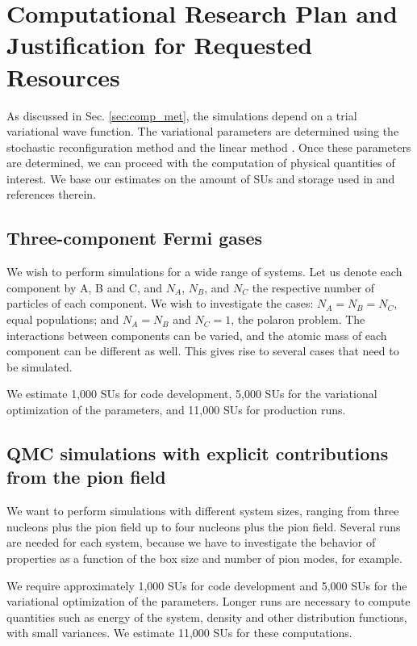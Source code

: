 \documentclass[12pt,letterpaper]{article}
\begin{document}
\section{Computational Research Plan and Justification for Requested 
Resources}

As discussed in Sec. \ref{sec:comp_met}, the simulations depend on a trial 
variational wave function. The variational parameters are determined using 
the stochastic reconfiguration method \cite{cas04}
and the linear method \cite{con17}. Once these parameters 
are determined, we can proceed with the computation of physical quantities 
of interest. We base our estimates on the amount of SUs and storage used in 
\cite{car15} 
and references therein.

\subsection{Three-component Fermi gases}

We wish to perform simulations for a wide range of systems.
Let us denote each component by A, B and C, and $N_A$, $N_B$, and
$N_C$ the respective number of particles of each component. We wish
to investigate the cases: $N_A=N_B=N_C$, equal populations; and
$N_A=N_B$ and $N_C=1$, the polaron problem. The interactions
between components can be varied, and the atomic mass of each component
can be different as well. This gives rise to several cases that need
to be simulated.

We estimate 1,000 SUs for code development, 
5,000 SUs for the variational optimization of the parameters, 
and 11,000 SUs for production runs.

\subsection{QMC simulations with explicit contributions from the pion field}

We want to perform simulations with different system 
sizes, ranging from three nucleons plus the pion field up to four nucleons plus 
the pion field. Several runs are needed for each 
system, because we have to investigate the behavior of properties as a function 
of the box size and number of pion modes, for example.

We require approximately 1,000 SUs for code development and
5,000 SUs for the variational optimization of the parameters. 
Longer runs are necessary to compute quantities
such as energy of the system, density and other distribution functions, 
with small variances. We estimate 11,000 SUs for these computations.
 
\end{document}
